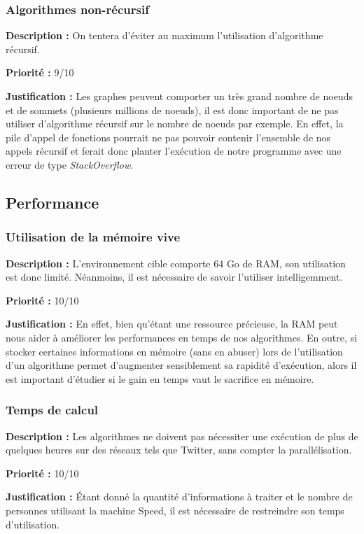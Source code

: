 \begin{titlepage}
\subsubsection{Algorithmes non-récursif}
{
\textbf{Description :} On tentera d'éviter au maximum l'utilisation d'algorithme récursif.

\textbf{Priorité :} 9/10

\textbf{Justification :} Les graphes peuvent comporter un très grand nombre de noeuds et de sommets (plusieurs millions de noeuds), il est donc important de ne pas utiliser d'algorithme récursif sur le nombre de noeuds par exemple. En effet, la pile d'appel de fonctions pourrait ne pas pouvoir contenir l'ensemble de nos appels récursif et ferait donc planter l'exécution de notre programme avec une erreur de type \textit{StackOverflow}.
}

\subsection{Performance}
\subsubsection{Utilisation de la mémoire vive}
{
\textbf{Description :} L'environnement cible comporte 64 Go de RAM, son utilisation est donc limité. Néanmoins, il est nécessaire de savoir l'utiliser intelligemment.

\textbf{Priorité :} 10/10

\textbf{Justification :} En effet, bien qu'étant une ressource précieuse, la RAM peut nous aider à améliorer les performances en temps de nos algorithmes. En outre, si stocker certaines informations en mémoire (sans en abuser) lors de l'utilisation d'un algorithme permet d'augmenter sensiblement sa rapidité d'exécution, alors il est important d'étudier si le gain en temps vaut le sacrifice en mémoire.
}

\subsubsection{Temps de calcul}
{
\textbf{Description :} Les algorithmes ne doivent pas nécessiter une exécution de plus de quelques heures sur des réseaux tels que Twitter, sans compter la parallélisation.

\textbf{Priorité :} 10/10

\textbf{Justification :} Étant donné la quantité d'informations à traiter et le nombre de personnes utilisant la machine Speed, il est nécessaire de restreindre son temps d'utilisation.
}


\end{titlepage}
